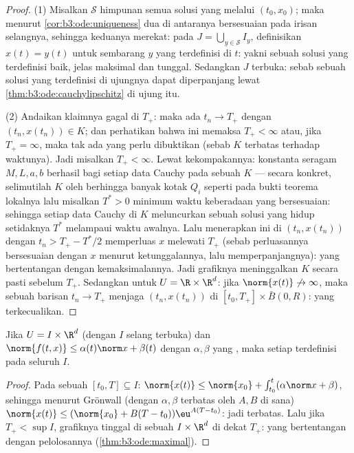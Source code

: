 \begin{proof}
(1) Misalkan $\mathcal S$ himpunan semua solusi yang melalui
$(t_0, x_0)$; maka menurut \cref{cor:b3:ode:uniqueness} dua di antaranya bersesuaian pada
irisan selangnya, sehingga keduanya merekat: pada $J =
\bigcup_{y \in \mathcal S}I_y$, definisikan $x(t) = y(t)$ untuk sembarang
$y$ yang terdefinisi di $t$: yakni sebuah solusi yang terdefinisi baik, jelas
maksimal dan tunggal. Sedangkan $J$ terbuka: sebab sebuah solusi yang terdefinisi di
ujungnya dapat diperpanjang lewat
\cref{thm:b3:ode:cauchylipschitz} di ujung itu.

(2) Andaikan klaimnya gagal di $T_+$: maka ada $t_n \to
T_+$ dengan $(t_n, x(t_n)) \in K$; dan perhatikan bahwa ini memaksa $T_+ <
\infty$ atau, jika $T_+ = \infty$, maka tak ada yang perlu dibuktikan (sebab $K$
terbatas terhadap waktunya). Jadi misalkan $T_+ < \infty$. Lewat kekompakannya: konstanta seragam $M, L, a,
b$ berhasil bagi setiap data Cauchy pada sebuah  $K$
--- secara konkret, selimutilah $K$ oleh berhingga banyak kotak $Q_i$ seperti pada
bukti teorema lokalnya lalu misalkan $T^* > 0$ minimum
waktu keberadaan yang bersesuaian: sehingga setiap data Cauchy di $K$
meluncurkan sebuah solusi yang hidup setidaknya $T^*$ melampaui waktu awalnya.
Lalu menerapkan ini di $(t_n, x(t_n))$ dengan $t_n > T_+ -
T^*/2$ memperluas $x$ melewati $T_+$ (sebab perluasannya bersesuaian dengan $x$
menurut ketunggalannya, lalu memperpanjangnya): yang bertentangan dengan
kemaksimalannya. Jadi grafiknya meninggalkan $K$ secara pasti sebelum
$T_+$. Sedangkan untuk $U = \R\times\R^d$: jika $\norm{x(t)}\not\to\infty$,
maka sebuah barisan $t_n \to T_+$ menjaga $(t_n, x(t_n))$ di 
$[t_0, T_+]\times\bar B(0, R)$: yang terkecualikan.
\end{proof}

\begin{corollary}
\label{cor:b3:ode:globallinear}
Jika $U = I\times\R^d$ (dengan $I$ selang terbuka) dan $\norm{f(t, x)}
\leq \alpha(t)\norm x + \beta(t)$ dengan $\alpha, \beta$ yang
, maka setiap  terdefinisi pada seluruh
$I$.
\end{corollary}

\begin{proof}
Pada sebuah  $[t_0, T] \subseteq I$: $\norm{x(t)} \leq
\norm{x_0} + \int_{t_0}^t(\alpha\norm x + \beta)$, sehingga menurut
Grönwall (dengan $\alpha, \beta$ terbatas oleh $A, B$ di sana)
$\norm{x(t)} \leq (\norm{x_0} + B(T - t_0))\eu^{A(T - t_0)}$:
jadi terbatas. Lalu jika $T_+ < \sup I$, grafiknya tinggal di sebuah 
$I\times\R^d$ di dekat $T_+$: yang bertentangan dengan pelolosannya
(\cref{thm:b3:ode:maximal}).
\end{proof}

